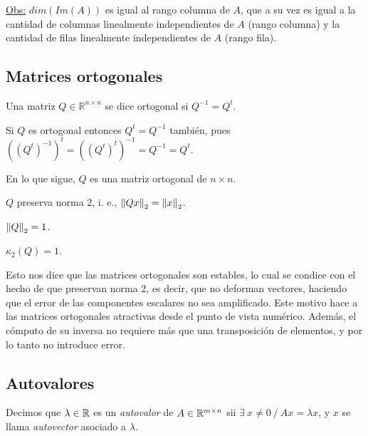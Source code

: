 \underline{Obs:} $dim(Im(A))$ es igual al rango columna de $A$, que a su vez es
igual a la cantidad de columnas linealmente independientes de $A$ (rango columna) y la cantidad de
filas linealmente independientes de $A$ (rango fila).

\subsection{Matrices ortogonales}

\begin{defi}
Una matriz $Q \in \mathbb{R}^{n \times n}$ se dice ortogonal si $Q^{-1} = Q^t$.
\end{defi}

\begin{obs}
Si $Q$ es ortogonal entonces $Q^t = Q^{-1}$ también, pues $((Q^t)^{-1})^t = ((Q^t)^t)^{-1} = Q^{-1} = Q^t$.
\end{obs}

En lo que sigue, $Q$ es una matriz ortogonal de $n \times n$.

\begin{lema}
$Q$ preserva norma 2, i. e., $\left\lVert Qx\right\rVert_2 = \left\lVert x\right\rVert_2$.
\end{lema}

\begin{lema}
$\left\lVert Q\right\rVert_2 = 1$.
\end{lema}

\begin{coro}
$\kappa_2(Q) = 1$.
\end{coro}

Esto nos dice que las matrices ortogonales son estables, lo cual se condice con el hecho de que preservan norma 2, es decir, que no deforman vectores, haciendo que el error de las componentes escalares no sea amplificado. Este motivo hace a las matrices ortogonales atractivas desde el punto de vista numérico. Además, el cómputo de su inversa no requiere más que una transposición de elementos, y por lo tanto no introduce error.

\subsection{Autovalores}
\begin{defi}
	Decimos que $\lambda \in \mathbb{R}$ es un \textit{autovalor} de $A \in\mathbb{R}^{m\times n}$ sii $\exists\ x\neq 0\ /\ Ax = \lambda x$,
	y $x$ se llama \textit{autovector} asociado a $\lambda$.
\end{defi}

